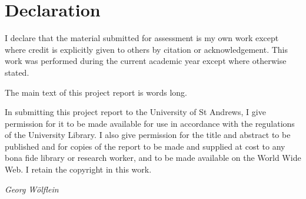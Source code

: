 \documentclass[../report.tex]{subfiles}
\begin{document}
\chapter*{Declaration}
I declare that the material submitted for assessment is my own work except where credit is explicitly given to others by citation or acknowledgement.
This work was performed during the current academic year except where otherwise stated.

The main text of this project report is \wordcount words long.

In submitting this project report to the University of St Andrews, I give permission for it to be made available for use in accordance with the regulations of the University Library. 
I also give permission for the title and abstract to be published and for copies of the report to be made and supplied at cost to any bona fide library or research worker, and to be made available on the World Wide Web.
I retain the copyright in this work.

\vspace{0.5cm}

\emph{Georg Wölflein}
\end{document}
